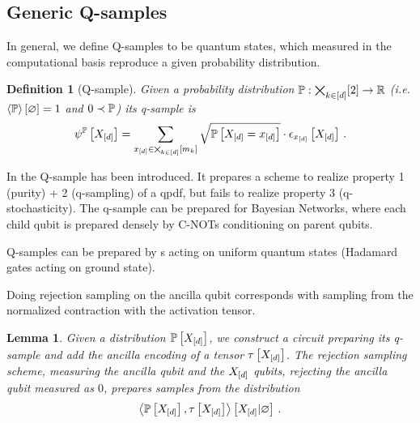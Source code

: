 \documentclass[aps,onecolumn,nofootinbib,pra]{article}
\newtheorem{lemma}{Lemma}
\newtheorem{definition}{Definition}
\begin{document}
    \subsection{Generic Q-samples}

    In general, we define Q-samples to be quantum states, which measured in the computational basis reproduce a given probability distribution.

    \begin{definition}[Q-sample]
        Given a probability distribution $\mathbb{P}:\bigtimes_{k\in[d]}[2]\rightarrow\mathbb{R}$ (i.e. $\left\langle \mathbb{P}\right\rangle \left[ \varnothing \right]=1$ and $0 \prec \mathbb{P}$) its q-sample is
        \begin{align*}
            \psi^{\mathbb{P}}\left[X_{[d]}\right]
            = \sum_{x_{[d]}\in\bigtimes_{k\in[d]}[m_{k}]} \sqrt{\mathbb{P}\left[X_{[d]}=x_{[d]}\right]} \cdot \epsilon_{x_{[d]}}\left[X_{[d]}\right] \, .
        \end{align*}
    \end{definition}

    In \cite{low_quantum_2014} the Q-sample has been introduced.
    It prepares a scheme to realize property 1 (purity) + 2 (q-sampling) of a qpdf, but fails to realize property 3 (q-stochasticity).
    The q-sample can be prepared for Bayesian Networks, where each child qubit is prepared densely by C-NOTs conditioning on parent qubits.

    Q-samples can be prepared by \activationCircuit{}s acting on uniform quantum states (Hadamard gates acting on ground state).


    Doing rejection sampling on the ancilla qubit corresponds with sampling from the normalized contraction with the activation tensor.

    \begin{lemma}
        Given a distribution $\mathbb{P}\left[X_{[d]}\right]$, we construct a circuit preparing its q-sample and add the ancilla encoding of a tensor $\tau\left[X_{[d]}\right]$.
        The rejection sampling scheme, measuring the ancilla qubit and the $X_{[d]}$ qubits, rejecting the ancilla qubit measured as $0$, prepares samples from the distribution
        \begin{align*}
            \left\langle \mathbb{P}\left[X_{[d]}\right],\tau\left[X_{[d]}\right]\right\rangle \left[ X_{[d]} | \varnothing \right] \, .
        \end{align*}
    \end{lemma}
\end{document}
